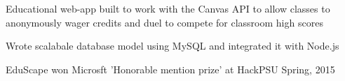 \documentclass[]{deedy-resume-openfont}
\begin{document}
\begin{minipage}[t]{0.66\textwidth}
\begin{tightemize}
\item Educational web-app built to work with the Canvas API to allow classes to anonymously wager credits and duel to compete for classroom high scores
\item Wrote scalabale database model using MySQL and integrated it with Node.js 
\item EduScape won Microsft 'Honorable mention prize' at HackPSU Spring, 2015
\end{tightemize}
\sectionsep

\end{minipage} 
\end{document}

